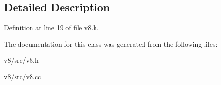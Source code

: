 \subsection{Detailed Description}


Definition at line 19 of file v8.\+h.



The documentation for this class was generated from the following files\+:\begin{DoxyCompactItemize}
\item 
v8/src/v8.\+h\item 
v8/src/v8.\+cc\end{DoxyCompactItemize}
